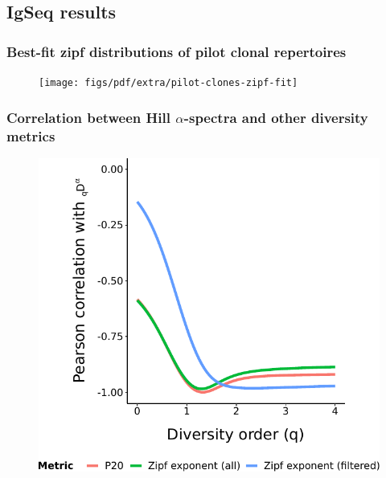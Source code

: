 \documentclass[presentation]{beamer}
\newlength{\slideheight}
\begin{document}
\subsection{IgSeq results}

\begin{frame}
\frametitle{Best-fit zipf distributions of pilot clonal repertoires}
\begin{figure}
\texttt{[image: figs/pdf/extra/pilot-clones-zipf-fit]}
\end{figure}
\end{frame}

\begin{frame}
\frametitle{Correlation between Hill $\alpha$-spectra and other diversity metrics}
\begin{figure}
\includegraphics[height=0.95\slideheight]{figs/pdf/extra/pilot-clone-diversity-metrics-cor}
\end{figure}
\end{frame}
\end{document}
